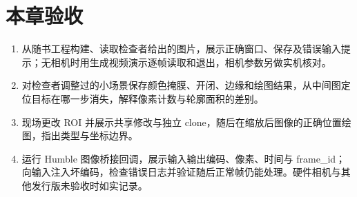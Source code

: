 \section{本章验收}
\begin{enumerate}
\item 从随书工程构建、读取检查者给出的图片，展示正确窗口、保存及错误输入提示；无相机时用生成视频演示逐帧读取和退出，相机参数另做实机核对。
\item 对检查者调整过的小场景保存颜色掩膜、开闭、边缘和绘图结果，从中间图定位目标在哪一步消失，解释像素计数与轮廓面积的差别。
\item 现场更改 ROI 并展示共享修改与独立 clone，随后在缩放后图像的正确位置绘图，指出类型与坐标边界。
\item 运行 Humble 图像桥接回调，展示输入输出编码、像素、时间与 frame\_id；向输入注入坏编码，检查错误日志并验证随后正常帧仍能处理。硬件相机与其他发行版未验收时如实记录。
\end{enumerate}
